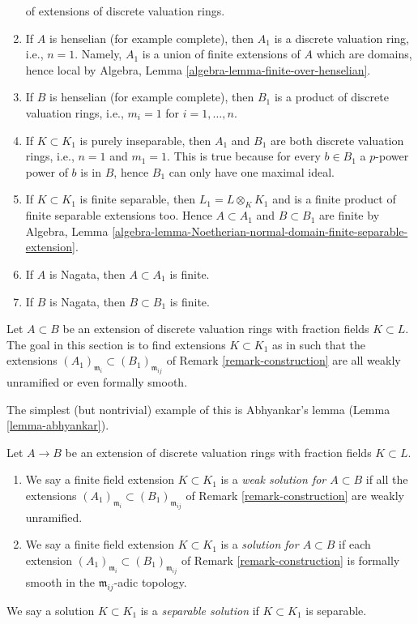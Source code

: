 \begin{remark}
\begin{enumerate}
$${}
$$
of extensions of discrete valuation rings.
\item If $A$ is henselian (for example complete), then $A_1$ is a
discrete valuation ring, i.e., $n = 1$.
Namely, $A_1$ is a union of finite extensions of $A$ which are domains,
hence local by Algebra, Lemma \ref{algebra-lemma-finite-over-henselian}.
\item If $B$ is henselian (for example complete), then $B_1$
is a product of discrete valuation rings, i.e., $m_i = 1$ for
$i = 1, \ldots, n$.
\item If $K \subset K_1$ is purely inseparable, then $A_1$ and $B_1$
are both discrete valuation rings, i.e., $n = 1$ and $m_1 = 1$.
This is true because for every $b \in B_1$ a $p$-power power of $b$
is in $B$, hence $B_1$ can only have one maximal ideal.
\item If $K \subset K_1$ is finite separable, then $L_1 = L \otimes_K K_1$
and is a finite product of finite separable extensions too. Hence
$A \subset A_1$ and $B \subset B_1$ are finite by
Algebra, Lemma
\ref{algebra-lemma-Noetherian-normal-domain-finite-separable-extension}.
\item If $A$ is Nagata, then $A \subset A_1$ is finite.
\item If $B$ is Nagata, then $B \subset B_1$ is finite.
\end{enumerate}
\end{remark}

\noindent
Let $A \subset B$ be an extension of discrete valuation rings with
fraction fields $K \subset L$.
The goal in this section is to find extensions $K \subset K_1$ as in
such that the extensions
$(A_1)_{\mathfrak m_i} \subset (B_1)_{\mathfrak m_{ij}}$
of Remark \ref{remark-construction} 
are all weakly unramified or even formally smooth.

\medskip\noindent
The simplest (but nontrivial) example of this is Abhyankar's lemma
(Lemma \ref{lemma-abhyankar}).

\begin{definition}
\label{definition-solution}
Let $A \to B$ be an extension of discrete valuation rings with fraction
fields $K \subset L$.
\begin{enumerate}
\item We say a finite field extension $K \subset K_1$ is a
{\it weak solution for $A \subset B$} if all the extensions
$(A_1)_{\mathfrak m_i} \subset (B_1)_{\mathfrak m_{ij}}$ of
Remark \ref{remark-construction} are weakly unramified.
\item We say a finite field extension $K \subset K_1$ is a
{\it solution for $A \subset B$} if each extension
$(A_1)_{\mathfrak m_i} \subset (B_1)_{\mathfrak m_{ij}}$ of
Remark \ref{remark-construction} is formally smooth in
the $\mathfrak m_{ij}$-adic topology.
\end{enumerate}
We say a solution $K \subset K_1$ is a {\it separable solution}
if $K \subset K_1$ is separable.
\end{definition}

